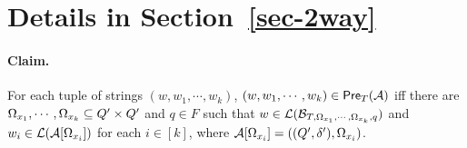 \section{Details in Section~\ref{sec-2way}} \label{appendix:sec-2way}

\paragraph{Claim.} For each tuple of strings $(w, w_1,\cdots, w_k)$, $(w, w_1,\cdots, w_k) \in \textsf{Pre}_{T}(\mathcal{A})$ iff there are $\Omega_{x_1}, \cdots, \Omega_{x_k} \subseteq Q' \times Q'$ and $q \in F$ such that $w \in \mathcal{L}(\mathcal{B}_{T, \Omega_{x_1}, \cdots, \Omega_{x_k}, q})$ and $w_i \in \mathcal{L}(\mathcal{A}[\Omega_{x_i}])$ for each $i \in [k]$, where $\mathcal{A}[\Omega_{x_i}]=((Q', \delta'), \Omega_{x_i})$.

